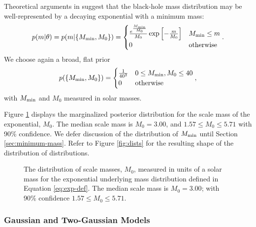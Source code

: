 \documentclass[preprint]{aastex}
\newcommand{\Mmin}{M_{\textnormal{min}}}
\begin{document}
Theoretical arguments in \citet{Fryer2001} suggest that the black-hole
mass distribution may be well-represented by a decaying exponential
with a minimum mass:
\begin{equation}
  \label{eq:exp-def}
  p(m|\theta) = p(m|\{\Mmin, M_0\}) = 
  \begin{cases}
    \frac{e^{\frac{\Mmin}{M_0}}}{M_0} \exp \left[ - \frac{m}{M_0}
    \right] & \Mmin \leq m \\
    0 & \textnormal{otherwise}
  \end{cases}.
\end{equation}
We choose again a broad, flat prior
\begin{equation}
  p(\{\Mmin, M_0 \}) = 
  \begin{cases}
    \frac{1}{40^2} & 0 \leq \Mmin, M_0 \leq 40 \\
    0 & \textnormal{otherwise}
  \end{cases},
\end{equation}
with $\Mmin$ and $M_0$ measured in solar masses.

Figure \ref{fig:exp-M0} displays the marginalized posterior
distribution for the scale mass of the exponential, $M_0$.  The median
scale mass is $M_0 = 3.00$, and $1.57 \leq M_0 \leq 5.71$ with 90\%
confidence.  We defer discussion of the distribution of $\Mmin$ until
Section \ref{sec:minimum-mass}.  Refer to Figure \ref{fig:dists}
for the resulting shape of the distribution of distributions.

\begin{figure}
  \begin{center}
  \end{center}
  \caption{\label{fig:exp-M0} The distribution of scale masses, $M_0$,
    measured in units of a solar mass for the exponential underlying
    mass distribution defined in Equation \eqref{eq:exp-def}.  The
    median scale mass is $M_0 = 3.00$; with 90\% confidence $1.57 \leq
    M_0 \leq 5.71$. }
\end{figure}

\subsubsection{Gaussian and Two-Gaussian Models}
\label{subsubsec:gaussian}
\end{document}
